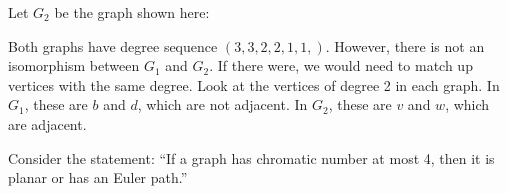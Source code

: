 \documentclass[11pt]{exam}
\def\imp{\rightarrow}
\begin{document}
\begin{questions}
\begin{parts}
\begin{solution}

Let $G_2$ be the graph shown here:


Both graphs have degree sequence $(3,3,2,2,1,1,)$.  However, there is not an isomorphism between $G_1$ and $G_2$.  If there were, we would need to match up vertices with the same degree.  Look at the vertices of degree 2 in each graph.  In $G_1$, these are $b$ and $d$, which are not adjacent.  In $G_2$, these are $v$ and $w$, which are adjacent.
	\end{solution}


	\vfill


\end{parts}



\newpage

\question Consider the statement: ``If a graph has chromatic number at most 4, then it is planar or has an Euler path.''
\end{questions}
\end{document}
